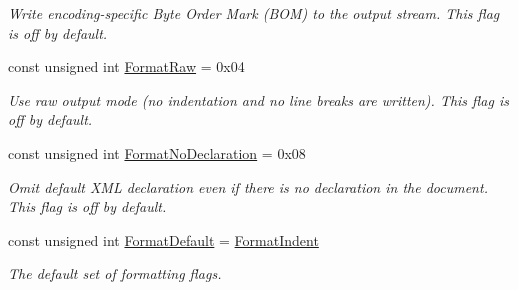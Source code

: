 \begin{DoxyCompactItemize}
\begin{DoxyCompactList}\small\item\em Write encoding-\/specific Byte Order Mark (BOM) to the output stream. This flag is off by default. \item\end{DoxyCompactList}\item 
\hypertarget{namespacephys_1_1xml_a6f6696cbdc48011817adad7978e83976}{
const unsigned int \hyperlink{namespacephys_1_1xml_a6f6696cbdc48011817adad7978e83976}{FormatRaw} = 0x04}
\label{d9/d27/namespacephys_1_1xml_a6f6696cbdc48011817adad7978e83976}

\begin{DoxyCompactList}\small\item\em Use raw output mode (no indentation and no line breaks are written). This flag is off by default. \item\end{DoxyCompactList}\item 
\hypertarget{namespacephys_1_1xml_aee4ccb3535945d4808a0cf6abe4cb050}{
const unsigned int \hyperlink{namespacephys_1_1xml_aee4ccb3535945d4808a0cf6abe4cb050}{FormatNoDeclaration} = 0x08}
\label{d9/d27/namespacephys_1_1xml_aee4ccb3535945d4808a0cf6abe4cb050}

\begin{DoxyCompactList}\small\item\em Omit default XML declaration even if there is no declaration in the document. This flag is off by default. \item\end{DoxyCompactList}\item 
const unsigned int \hyperlink{namespacephys_1_1xml_a08bf6aab51f79929d9097706a5e64408}{FormatDefault} = \hyperlink{namespacephys_1_1xml_afaad0b8f59b5f103218ed5cb39b1bbde}{FormatIndent}
\begin{DoxyCompactList}\small\item\em The default set of formatting flags. \item\end{DoxyCompactList}\end{DoxyCompactItemize}


